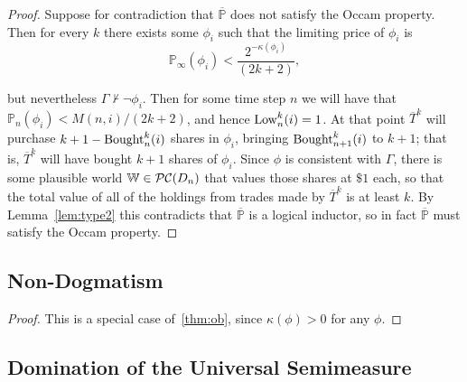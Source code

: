 \documentclass[authordate,onecolumn,noenvironments]{miri-tech-article}
\numberwithin{equation}{subsection}
\newcommand{\seq}[1]{{\overline{#1}}}
\newcommand{\li}{logical inductor}
\newcommand{\trade}{T}%
\newcommand{\Trader}{\seq{\trade}} %
\newcommand{\BelState}{\mathbb{P}}
\newcommand{\pt}{\BelState}
\newcommand{\MP}{\seq{\pt}}
\newcommand{\dt}{D}
\newcommand{\pcworlds}{\mathcal{P\-C}}
\newcommand{\World}{\mathbb{W}}
\newcommand{\Theory}{\Gamma}
\newcommand{\amountbought}{{\rm Bought}}
\newcommand{\lowprice}{{\rm Low}}
\begin{document}
\begin{proof}
Suppose for contradiction that $\MP$ does not satisfy the Occam property.  
Then for every $k$ there exists some $\phi_i$ such that  the limiting price of $\phi_i$ is 
%
\[\pt_\infty(\phi_i) < \frac{2^{-\kappa(\phi_i)}  }{(2k+2)}, \]  

%
but nevertheless $\Theory\nvdash \neg\phi_i $. 
Then for some time step $n$ we will have that $ \pt_n(\phi_i) < M(n,i)/(2k+2) $,  and hence $\lowprice^k_n(i)= 1 $. At that point 
$\Trader^k$ will purchase  $k+1 - \amountbought^k_n(i)$ shares in
$\phi_i$, bringing   $\amountbought^k_{n+1} (i)$ to $k+1$; that is, $\Trader^k$ will have bought $k + 1$ shares of $\phi_i$.  
Since $\phi$ is consistent with $\Theory$, 
there is some  plausible world $\World \in \pcworlds(\dt_{n})$ that values those shares at $\$ 1$ each, so that the total value of all of the holdings from trades made
by $\Trader^k$ is at least $k$.
By Lemma~\ref{lem:type2} this contradicts that $\MP$ is a  \li{}, so in fact $\MP$ must satisfy the Occam property. 
\end{proof}


\subsection{Non-Dogmatism}\label{app:nondog}

\restatenondog*

\begin{proof}
  This is a special case of~\ref{thm:ob}, since $\kappa(\phi) >0$ for any $\phi$.
\end{proof}






\subsection{Domination of the Universal Semimeasure}\label{app:dus}

\restatedus*
\end{document}
